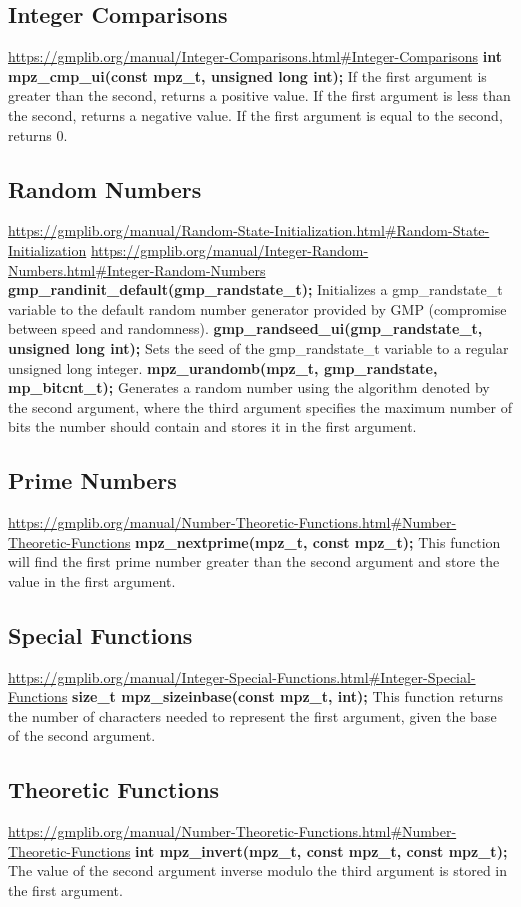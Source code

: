 \subsection{Integer Comparisons}

\url{https://gmplib.org/manual/Integer-Comparisons.html#Integer-Comparisons}
\medskip
\break
\textbf{int mpz\_cmp\_ui(const mpz\_t, unsigned long int);}\break
If the first argument is greater than the second, returns
a positive value. If the first argument is less than the
second, returns a negative value. If the first argument is
equal to the second, returns 0.

\subsection{Random Numbers}

\url{https://gmplib.org/manual/Random-State-Initialization.html#Random-State-Initialization}
\url{https://gmplib.org/manual/Integer-Random-Numbers.html#Integer-Random-Numbers}
\medskip
\break
\textbf{gmp\_randinit\_default(gmp\_randstate\_t);}\break
Initializes a gmp\_randstate\_t variable to the default
random number generator provided by GMP (compromise between
speed and randomness).
\medskip
\break
\textbf{gmp\_randseed\_ui(gmp\_randstate\_t, unsigned long int);}\break
Sets the seed of the gmp\_randstate\_t variable to a regular
unsigned long integer.
\medskip
\break
\textbf{mpz\_urandomb(mpz\_t, gmp\_randstate, mp\_bitcnt\_t);}\break
Generates a random number using the algorithm denoted by the
second argument, where the third argument specifies the
maximum number of bits the number should contain and stores
it in the first argument.

\subsection{Prime Numbers}

\url{https://gmplib.org/manual/Number-Theoretic-Functions.html#Number-Theoretic-Functions}
\medskip
\break
\textbf{mpz\_nextprime(mpz\_t, const mpz\_t);}\break
This function will find the first prime number greater than
the second argument and store the value in the first
argument.

\subsection{Special Functions}

\url{https://gmplib.org/manual/Integer-Special-Functions.html#Integer-Special-Functions}
\medskip
\break
\textbf{size\_t mpz\_sizeinbase(const mpz\_t, int);}\break
This function returns the number of characters needed to
represent the first argument, given the base of the second
argument.

\subsection{Theoretic Functions}

\url{https://gmplib.org/manual/Number-Theoretic-Functions.html#Number-Theoretic-Functions}
\medskip
\break
\textbf{int mpz\_invert(mpz\_t, const mpz\_t, const mpz\_t);}\break
The value of the second argument inverse modulo the third
argument is stored in the first argument.
